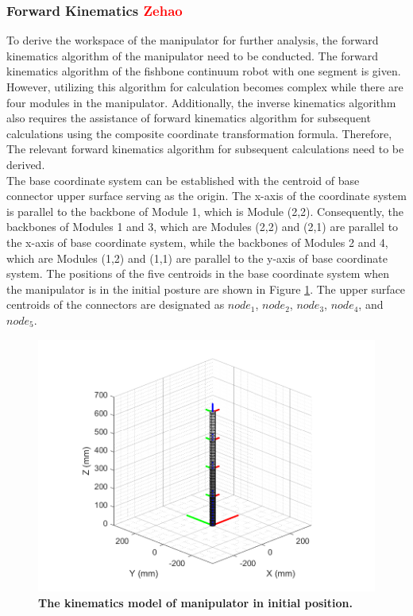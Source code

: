 \subsubsection{Forward Kinematics \textcolor{red}{Zehao}}
To derive the workspace of the manipulator for further analysis, the forward kinematics algorithm of the manipulator 
need to be conducted. The forward kinematics algorithm of the fishbone continuum robot\cite{fishboneCR} with one 
segment is given. However, utilizing this algorithm for calculation becomes complex while there are four modules in 
the manipulator. Additionally, the inverse kinematics algorithm also requires the assistance of forward kinematics 
algorithm for subsequent calculations using the composite coordinate transformation formula. Therefore, The relevant 
forward kinematics algorithm for subsequent calculations need to be derived. \\
The base coordinate system can be established with the centroid of base connector upper surface serving as the origin. 
The x-axis of the coordinate system is parallel to the backbone of Module 1, which is Module (2,2). Consequently, 
the backbones of Modules 1 and 3, which are Modules (2,2) and (2,1) are parallel to the x-axis of base coordinate 
system, while the backbones of Modules 2 and 4, which are Modules (1,2) and (1,1) are parallel to the y-axis of base 
coordinate system. The positions of the five centroids in the base coordinate system when the manipulator is in the 
initial posture are shown in Figure \ref{fig:kinematics model 0_0_0_0}. The upper surface centroids of the connectors 
are designated as $node_1$, $node_2$, $node_3$, $node_4$, and $node_5$. \\
\begin{figure}[H] %
    \centering
    \captionsetup{labelsep=colon}
    \includegraphics[width=1.0\textwidth]{Image/MATLAB/manipulator_0_0_0_0.png} 
    \caption[The kinematics model of manipulator in the initial position]
    {\centering \textbf{The kinematics model of manipulator in initial position.}}
    \label{fig:kinematics model 0_0_0_0}
\end{figure}
